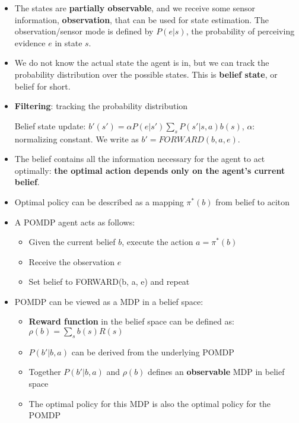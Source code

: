 \documentclass[12pt]{article}
\begin{document}
\begin{itemize}
\item The states are \textbf{partially observable}, and we receive some sensor information, \textbf{observation}, that can be used for state estimation. The observation/sensor mode is defined by $P(e|s)$, the probability of perceiving evidence $e$ in state $s$. 
\item We do not know the actual state the agent is in, but we can track the probability distribution over the possible states. This is \textbf{belief state}, or belief for short.
\item \textbf{Filtering}: tracking the probability distribution

\begin{tcolorbox}
Belief state update: $b'(s') = \alpha P(e|s') \sum_{s}{}P(s' | s, a)b(s)$, $\alpha$: normalizing constant. We write as $b'= FORWARD(b, a, e)$.
\end{tcolorbox}


\item The belief contains all the information necessary for the agent to act optimally: \textbf{the optimal action depends only on the agent's current belief}.
\item Optimal policy can be described as a mapping $\pi^*(b)$ from belief to aciton
\item A POMDP agent acts as follows:

\begin{itemize}
\item Given the current belief $b$, execute the action $a = \pi^*(b)$
\item Receive the observation $e$
\item Set belief to FORWARD(b, a, e) and repeat
\end{itemize}

\item POMDP can be viewed as a MDP in a belief space:
\begin{itemize}
\item \textbf{Reward function} in the belief space can be defined as: $\rho(b) = \sum_{s}{} b(s)R(s)$
\item $P(b' | b, a)$ can be derived from the underlying POMDP
\item Together $P(b' | b, a)$ and $\rho(b)$ defines an \textbf{observable} MDP in belief space
\item The optimal policy for this MDP is also the optimal policy for the POMDP
\end{itemize}
\end{itemize}
\end{document}
